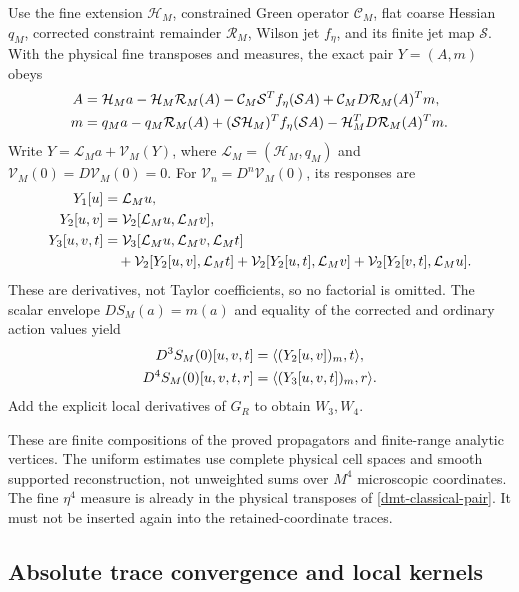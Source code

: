 Use the fine extension \(\mathcal H_M\), constrained Green
operator \(\mathcal C_M\), flat coarse Hessian \(q_M\),
corrected constraint remainder \(\mathcal R_M\), Wilson
jet \(f_\eta\), and its finite jet map \(\mathcal S\).
With the physical fine transposes and measures, the exact
pair \(Y=(A,m)\) obeys
\begin{align}
 A={}&\mathcal H_Ma-\mathcal H_M\mathcal R_M(A)
       -\mathcal C_M\mathcal S^Tf_\eta(\mathcal SA)
       +\mathcal C_MD\mathcal R_M(A)^Tm,\notag\\
 m={}&q_Ma-q_M\mathcal R_M(A)
       +(\mathcal S\mathcal H_M)^Tf_\eta(\mathcal SA)
       -\mathcal H_M^TD\mathcal R_M(A)^Tm.
 \label{dmt-classical-pair}
\end{align}
Write \(Y=\mathcal L_Ma+\mathcal V_M(Y)\), where
\(\mathcal L_M=(\mathcal H_M,q_M)\) and
\(\mathcal V_M(0)=D\mathcal V_M(0)=0\).
For \(\mathcal V_n=D^n\mathcal V_M(0)\), its responses are
\begin{align}
 Y_1[u]&=\mathcal L_Mu,\notag\\
 Y_2[u,v]&=\mathcal V_2[\mathcal L_Mu,\mathcal L_Mv],\notag\\
 Y_3[u,v,t]&=\mathcal V_3[
                  \mathcal L_Mu,\mathcal L_Mv,\mathcal L_Mt]\notag\\
 &\quad+\mathcal V_2[Y_2[u,v],\mathcal L_Mt]
       +\mathcal V_2[Y_2[u,t],\mathcal L_Mv]
       +\mathcal V_2[Y_2[v,t],\mathcal L_Mu].
 \label{dmt-classical-response-recursion}
\end{align}
These are derivatives, not Taylor coefficients, so no factorial
is omitted. The scalar envelope \(DS_M(a)=m(a)\) and equality
of the corrected and ordinary action values yield
\begin{align}
 D^3S_M(0)[u,v,t]
       &=\langle(Y_2[u,v])_m,t\rangle,\notag\\
 D^4S_M(0)[u,v,t,r]
       &=\langle(Y_3[u,v,t])_m,r\rangle.
 \label{dmt-classical-scalar-vertices}
\end{align}
Add the explicit local derivatives of \(G_R\) to obtain
\(W_3,W_4\).

These are finite compositions of the proved propagators and
finite-range analytic vertices. The uniform estimates use
complete physical cell spaces and smooth supported
reconstruction, not unweighted sums over \(M^4\) microscopic
coordinates. The fine \(\eta^4\) measure is already in the
physical transposes of \eqref{dmt-classical-pair}. It must
not be inserted again into the retained-coordinate traces.

\subsection{Absolute trace convergence and local kernels}
\label{dmt-convergence-section}

